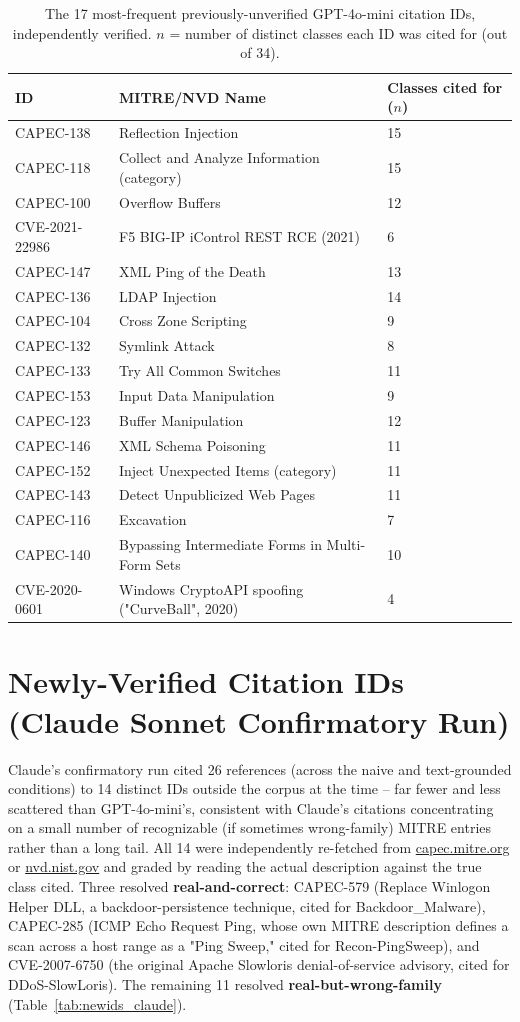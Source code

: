 \documentclass[11pt]{article}
\begin{document}
\begin{table}[htbp]
\centering
\caption{The 17 most-frequent previously-unverified GPT-4o-mini citation IDs, independently
verified. $n$ = number of distinct classes each ID was cited for (out of 34).}
\label{tab:newids}
\begin{tabular}{lll}
\toprule
ID & MITRE/NVD Name & Classes cited for ($n$) \\
\midrule
CAPEC-138 & Reflection Injection & 15 \\
CAPEC-118 & Collect and Analyze Information (category) & 15 \\
CAPEC-100 & Overflow Buffers & 12 \\
CVE-2021-22986 & F5 BIG-IP iControl REST RCE (2021) & 6 \\
CAPEC-147 & XML Ping of the Death & 13 \\
CAPEC-136 & LDAP Injection & 14 \\
CAPEC-104 & Cross Zone Scripting & 9 \\
CAPEC-132 & Symlink Attack & 8 \\
CAPEC-133 & Try All Common Switches & 11 \\
CAPEC-153 & Input Data Manipulation & 9 \\
CAPEC-123 & Buffer Manipulation & 12 \\
CAPEC-146 & XML Schema Poisoning & 11 \\
CAPEC-152 & Inject Unexpected Items (category) & 11 \\
CAPEC-143 & Detect Unpublicized Web Pages & 11 \\
CAPEC-116 & Excavation & 7 \\
CAPEC-140 & Bypassing Intermediate Forms in Multi-Form Sets & 10 \\
CVE-2020-0601 & Windows CryptoAPI spoofing ("CurveBall", 2020) & 4 \\
\bottomrule
\end{tabular}
\end{table}

\section{Newly-Verified Citation IDs (Claude Sonnet Confirmatory Run)}

Claude's confirmatory run cited 26 references (across the naive and text-grounded conditions)
to 14 distinct IDs outside the corpus at the time -- far fewer and less scattered than
GPT-4o-mini's, consistent with Claude's citations concentrating on a small number of recognizable
(if sometimes wrong-family) MITRE entries rather than a long tail. All 14 were independently
re-fetched from \url{capec.mitre.org} or \url{nvd.nist.gov} and graded by reading the actual
description against the true class cited. Three resolved \textbf{real-and-correct}: CAPEC-579
(Replace Winlogon Helper DLL, a backdoor-persistence technique, cited for Backdoor\_Malware),
CAPEC-285 (ICMP Echo Request Ping, whose own MITRE description defines a scan across a host range
as a "Ping Sweep," cited for Recon-PingSweep), and CVE-2007-6750 (the original Apache Slowloris
denial-of-service advisory, cited for DDoS-SlowLoris). The remaining 11 resolved
\textbf{real-but-wrong-family} (Table~\ref{tab:newids_claude}).
\end{document}
